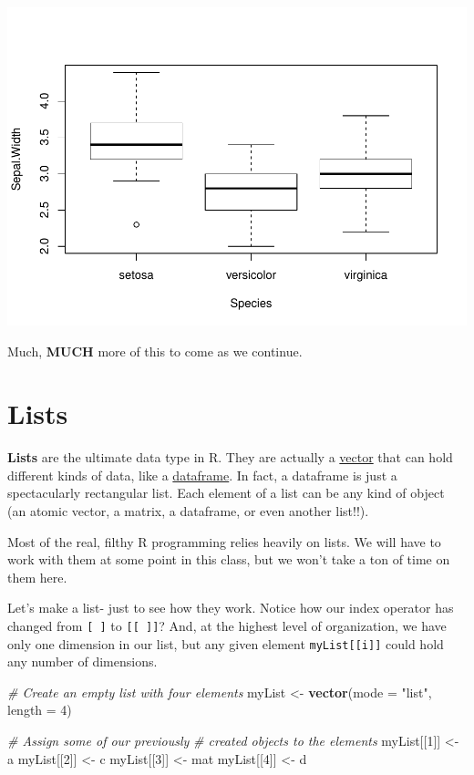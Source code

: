 \documentclass[
]{book}
\newenvironment{Shaded}{\begin{snugshade}}{\end{snugshade}}
\newcommand{\CommentTok}[1]{\textcolor[rgb]{0.56,0.35,0.01}{\textit{#1}}}
\newcommand{\DataTypeTok}[1]{\textcolor[rgb]{0.13,0.29,0.53}{#1}}
\newcommand{\DecValTok}[1]{\textcolor[rgb]{0.00,0.00,0.81}{#1}}
\newcommand{\KeywordTok}[1]{\textcolor[rgb]{0.13,0.29,0.53}{\textbf{#1}}}
\newcommand{\NormalTok}[1]{#1}
\newcommand{\StringTok}[1]{\textcolor[rgb]{0.31,0.60,0.02}{#1}}
\begin{document}
\includegraphics{worstr_files/figure-latex/unnamed-chunk-54-3.pdf}

Much, \textbf{MUCH} more of this to come as we continue.

\hypertarget{lists}{%
\section{Lists}\label{lists}}

\textbf{Lists} are the ultimate data type in R. They are actually a \href{vectors}{vector} that can hold different kinds of data, like a \protect\hyperlink{dataframes}{dataframe}. In fact, a dataframe is just a spectacularly rectangular list. Each element of a list can be any kind of object (an atomic vector, a matrix, a dataframe, or even another list!!).

Most of the real, filthy R programming relies heavily on lists. We will have to work with them at some point in this class, but we won't take a ton of time on them here.

Let's make a list- just to see how they work. Notice how our index operator has changed from \texttt{{[}\ {]}} to \texttt{{[}{[}\ {]}{]}}? And, at the highest level of organization, we have only one dimension in our list, but any given element \texttt{myList{[}{[}i{]}{]}} could hold any number of dimensions.

\begin{Shaded}
\begin{Highlighting}[]
\CommentTok{# Create an empty list with four elements}
\NormalTok{myList <-}\StringTok{ }\KeywordTok{vector}\NormalTok{(}\DataTypeTok{mode =} \StringTok{"list"}\NormalTok{, }\DataTypeTok{length =} \DecValTok{4}\NormalTok{)}

\CommentTok{# Assign some of our previously}
\CommentTok{# created objects to the elements}
\NormalTok{myList[[}\DecValTok{1}\NormalTok{]] <-}\StringTok{ }\NormalTok{a}
\NormalTok{myList[[}\DecValTok{2}\NormalTok{]] <-}\StringTok{ }\NormalTok{c}
\NormalTok{myList[[}\DecValTok{3}\NormalTok{]] <-}\StringTok{ }\NormalTok{mat}
\NormalTok{myList[[}\DecValTok{4}\NormalTok{]] <-}\StringTok{ }\NormalTok{d}
\end{Highlighting}
\end{Shaded}
\end{document}
